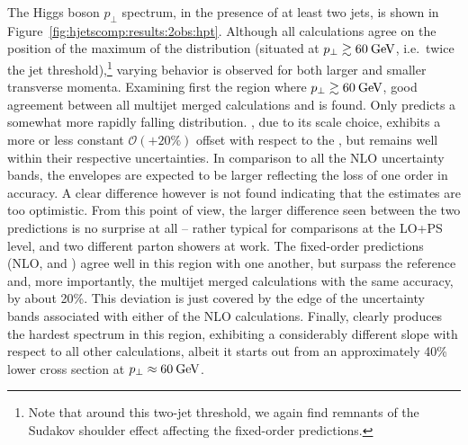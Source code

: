 The Higgs boson $p_\perp$ spectrum, in the presence of at least two
jets, is shown in Figure~\ref{fig:hjetscomp:results:2obs:hpt}.
Although all calculations agree on the position of the maximum
of the distribution (situated at $p_\perp\gtrsim 60\text{\:GeV}$, i.e.~twice the 
jet threshold),\footnote{Note that around this two-jet threshold, we
  again find remnants of the Sudakov shoulder effect affecting the
  fixed-order predictions.}
varying behavior is observed for both larger and smaller 
transverse momenta. Examining first the region where $p_\perp\gtrsim 
60\text{\:GeV}$, good agreement between all multijet merged calculations and 
\Powheg is found. Only \Herwig predicts a somewhat more rapidly falling 
distribution. \Sherpa \NNLOPS, due to its scale choice, exhibits a 
more or less constant $\mathcal{O}(+20\%)$ offset with respect to the
\Powheg \NNLOPS, but remains well within their respective uncertainties.
In comparison to all the NLO uncertainty bands, the \NNLOPS envelopes
are expected to be larger reflecting the loss of one order in accuracy.
A clear difference however is not found indicating that the \NNLOPS
estimates are too optimistic. From this point of view, the larger
difference seen between the two \NNLOPS predictions is no surprise at
all -- rather typical for comparisons at the LO+PS level, and two
different parton showers at work. The fixed-order
predictions (NLO, \Minlo and \Loopsim) agree well in this region with
one another, but surpass the \Powheg reference and, more importantly,
the multijet merged calculations with the same accuracy, by about 
20\%. This deviation is just covered by the edge of the uncertainty
bands associated with either of the NLO calculations. Finally, \Hej
clearly produces the hardest spectrum in this region, exhibiting a
considerably different slope with respect to all other calculations,
albeit it starts out from an approximately 40\% lower cross section at
$p_\perp\approx 60\text{\:GeV}$.

